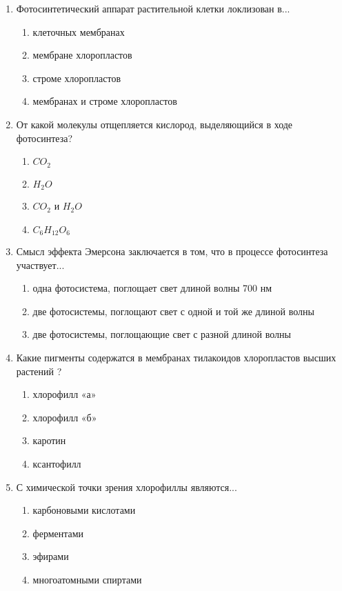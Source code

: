 \begin{enumerate}
\item Фотосинтетический аппарат растительной клетки локлизован в...
\begin{enumerate}
	\item клеточных мембранах          
	\item мембране хлоропластов
	\item строме хлоропластов            
	\item мембранах и строме хлоропластов
\end{enumerate}

\item От какой молекулы отщепляется кислород, выделяющийся в ходе фотосинтеза?
\begin{enumerate}
	\item $CO_{2}$                  
	\item $H_{2}O$
	\item $CO_{2}$ и $H_{2}O$       
	\item $C_{6}H_{12}O_{6}$
\end{enumerate}

\item Смысл эффекта Эмерсона заключается в том, что в процессе фотосинтеза участвует...
\begin{enumerate}
	\item одна фотосистема, поглощает свет длиной волны 700 нм
	\item две фотосистемы, поглощают свет с одной и той же длиной
волны
	\item две фотосистемы, поглощающие свет с разной длиной волны
\end{enumerate}

\item Какие пигменты содержатся в мембранах тилакоидов хлоропластов высших растений ?
\begin{enumerate}
	\item хлорофилл «а»          
	\item хлорофилл «б»
	\item каротин                      
	\item ксантофилл
\end{enumerate}

\item С химической точки зрения хлорофиллы являются...
\begin{enumerate}
	\item карбоновыми кислотами         
	\item ферментами
	\item эфирами                                     
	\item многоатомными спиртами
\end{enumerate}


\end{enumerate}
